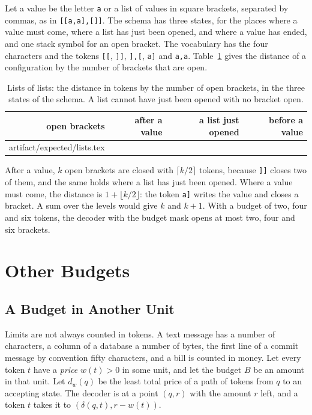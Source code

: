 \documentclass[acmsmall,nonacm,screen]{acmart}
\makeatletter
\newcommand{\str}[1]{\texttt{#1}}
\newcommand{\far}{d}
\newcommand{\claim}[2]{#2}
\newcommand{\rows}[1]{\@@input artifact/expected/#1.tex }
\makeatother
\begin{document}
Let a value be the letter \str{a} or a list of values in square brackets, separated by
commas, as in \str{[[a,a],[]]}. The schema has three states, for the places where a value
must come, where a list has just been opened, and where a value has ended, and one stack
symbol for an open bracket. The vocabulary has the four characters and the tokens \str{[[},
\str{]]}, \str{],[}, \str{a]} and \str{a,a}. Table~\ref{tab:lists} gives the distance of a
configuration by the number of brackets that are open.

\begin{table}
\caption{Lists of lists: the distance in tokens by the number of open brackets, in the three
states of the schema. A list cannot have just been opened with no bracket
open.}\label{tab:lists}
\begin{tabular}{rrrr}
\toprule
open brackets & after a value & a list just opened & before a value \\
\midrule
\rows{lists}
\bottomrule
\end{tabular}
\end{table}

\claim{lists}{After a value, $k$ open brackets are closed with $\lceil k/2 \rceil$ tokens,
because \str{]]} closes two of them, and the same holds where a list has just been opened.
Where a value must come, the distance is $1 + \lfloor k/2 \rfloor$: the token \str{a]} writes
the value and closes a bracket. A sum over the levels would give $k$ and $k + 1$. With a
budget of two, four and six tokens, the decoder with the budget mask opens at most two, four
and six brackets.}

\section{Other Budgets}\label{sec:other}

\subsection{A Budget in Another Unit}

Limits are not always counted in tokens. A text message has a number of characters, a column
of a database a number of bytes, the first line of a commit message by convention fifty characters,
and a bill is counted in money. Let every token $t$ have a \emph{price} $w(t) > 0$ in some
unit, and let the budget $B$ be an amount in that unit. Let $\far_w(q)$ be the least total
price of a path of tokens from $q$ to an accepting state. The decoder is at a point $(q, r)$
with the amount $r$ left, and a token $t$ takes it to $(\delta(q, t), r - w(t))$.
\end{document}
